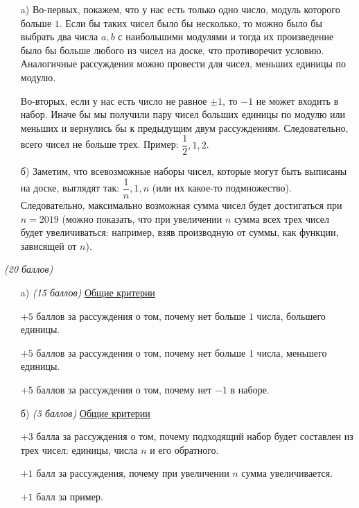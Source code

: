 \solutionSection
\begin{enumerate}

    \item[a)] Во-первых, покажем, что у нас есть только одно число, модуль которого больше $1$. Если бы таких чисел было бы несколько, то можно было бы выбрать два числа $a, b$ с наибольшими модулями и тогда их произведение было бы больше любого из чисел на доске, что противоречит условию. Аналогичные рассуждения можно провести для чисел, меньших единицы по модулю.
	
	Во-вторых, если у нас есть число не равное $\pm 1$, то $-1$ не может входить в набор. Иначе бы мы получили пару чисел больших единицы по модулю или меньших и вернулись бы к предыдущим двум рассуждениям. Следовательно, всего чисел не больше трех. Пример: $\dfrac{1}{2}, 1, 2$.

	\item[б)] Заметим, что всевозможные наборы чисел, которые могут быть выписаны на доске, выглядят так: $\dfrac{1}{n}, 1, n$ (или их какое-то подмножество). Следовательно, максимально возможная сумма чисел будет достигаться при $n = 2019$ (можно показать, что при увеличении $n$ сумма всех трех чисел будет увеличиваться: например, взяв производную от суммы, как функции, зависящей от $n$).
 
\end{enumerate}	


\additionalCriteria

\textit{(20 баллов)}

\begin{enumerate}

    \item[a)] \textit{(15 баллов)}
	\underline{Общие критерии}

	$+5$ баллов за рассуждения о том, почему нет больше $1$
	числа, большего единицы.
	
	$+5$ баллов за рассуждения о том, почему нет больше $1$
	числа, меньшего единицы.
	
	$+5$ баллов за рассуждения о том, почему нет $-1$ в наборе.
	
	\item[б)] \textit{(5 баллов)}
	\underline{Общие критерии}

	$+3$ балла за рассуждения о том, почему подходящий набор
	будет составлен из трех чисел: единицы, числа $n$ и его обратного.
	
	$+1$ балл за рассуждения, 
	почему при увеличении $n$ сумма увеличивается.
	
	$+1$ балл за пример.
		
\end{enumerate}